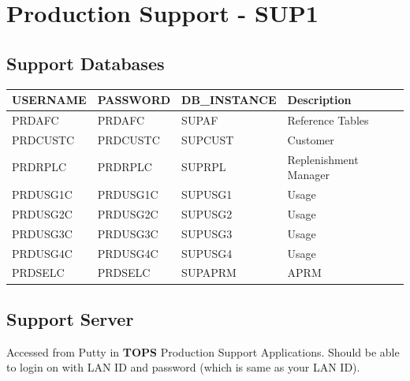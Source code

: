 \documentclass[12pt,twoside]{article}
\begin{document}
\section{Production Support - SUP1}
\label{sec-10}
\subsection{Support Databases}
\label{sec-10-1}


\begin{center}
\begin{tabular}{llll}
\hline
 \textbf{USERNAME}  &  \textbf{PASSWORD}  &  \textbf{DB\_INSTANCE}  &  \textbf{Description}   \\
\hline
 PRDAFC             &  PRDAFC             &  SUPAF                  &  Reference Tables       \\
 PRDCUSTC           &  PRDCUSTC           &  SUPCUST                &  Customer               \\
 PRDRPLC            &  PRDRPLC            &  SUPRPL                 &  Replenishment Manager  \\
 PRDUSG1C           &  PRDUSG1C           &  SUPUSG1                &  Usage                  \\
 PRDUSG2C           &  PRDUSG2C           &  SUPUSG2                &  Usage                  \\
 PRDUSG3C           &  PRDUSG3C           &  SUPUSG3                &  Usage                  \\
 PRDUSG4C           &  PRDUSG4C           &  SUPUSG4                &  Usage                  \\
 PRDSELC            &  PRDSELC            &  SUPAPRM                &  APRM                   \\
\hline
\end{tabular}
\end{center}
\subsection{Support Server}
\label{sec-10-2}

   Accessed from Putty in \textbf{TOPS} Production Support Applications.
   Should be able to login on with LAN ID and password (which is same as your LAN ID).
\end{document}
